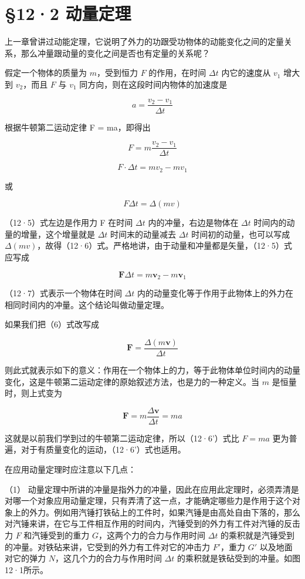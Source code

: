 \section{§12·2 动量定理}\label{ux52a8ux91cfux5b9aux7406}

上一章曾讲过动能定理，它说明了外力的功跟受功物体的动能变化之间的定量关系，那么冲量跟动量的变化之间是否也有定量的关系呢？

假定一个物体的质量为 \(m\)，受到恒力 \(F\) 的作用，在时间 \(\Delta t\)
内它的速度从 \(v_{1}\) 增大到 \(v_{2}\)，而且 \(F\) 与 \(v_{1}\)
同方向，则在这段时间内物体的加速度是

\[
a = \frac {v _ {2} - v _ {1}}{\Delta t}
\]

根据牛顿第二运动定律 F = ma，即得出

\[
F = m\frac{v_{2}-v_{1}}{\Delta t}
\]

\[
F\cdot\Delta t = mv_{2}-mv_{1} \tag{12.5}
\]

或

\[
F\Delta t = \Delta(mv) \tag{12.6}
\]

（12·5）式左边是作用力 F 在时间 \(\Delta t\) 内的冲量，右边是物体在
\(\Delta t\) 时间内的动量的增量，这个增量就是 \(\Delta t\)
时间末的动量减去 \(\Delta t\) 时间初的动量，也可以写成
\(\Delta (mv)\)，故得（12·6）式。严格地讲，由于动量和冲量都是矢量，（12·5）式应写成

\[
\boldsymbol {F} \Delta t = m \boldsymbol {v} _ {2} - m \boldsymbol {v} _ {1} \tag {12.7}
\]

（12·7）式表示一个物体在时间 \(\Delta t\)
内的动量变化等于作用于此物体上的外力在相同时间内的冲量。这个结论叫做动量定理。

如果我们把（6）式改写成

\[
\boldsymbol {F} = \frac {\Delta (m \boldsymbol {v})}{\Delta t} \tag {12.6'}
\]

则此式就表示如下的意义：作用在一个物体上的力，等于此物体单位时间内的动量变化，这是牛顿第二运动定律的原始叙述方法，也是力的一种定义。当
\(m\) 是恒量时，则上式变为

\[
\boldsymbol {F} = m \frac {\Delta \boldsymbol {v}}{\Delta t} = m a
\]

这就是以前我们学到过的牛顿第二运动定律，所以（12·6'）式比 \(F = ma\)
更为普遍，对于有质量变化的运动，（12·6'）式也适用。

在应用动量定理时应注意以下几点：

（1）
动量定理中所讲的冲量是指外力的冲量，因此在应用此定理时，必须弄清是对哪一个对象应用动量定理，只有弄清了这一点，才能确定哪些力是作用于这个对象上的外力。例如用汽锤打铁砧上的工件时，如果汽锤是由高处自由下落的，那么对汽锤来讲，在它与工件相互作用的时间内，汽锤受到的外力有工件对汽锤的反击力
\(F\) 和汽锤受到的重力 \(G\)，这两个力的合力与作用时间 \(\Delta t\)
的乘积就是汽锤受到的冲量。对铁砧来讲，它受到的外力有工件对它的冲击力
\(F'\)，重力 \(G'\) 以及地面对它的弹力 \(N\)，这几个力的合力与作用时间
\(\Delta t\) 的乘积就是铁砧受到的冲量。如图12·1所示。

